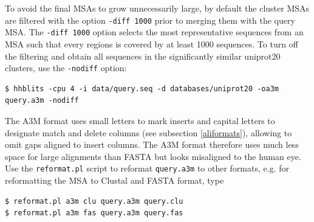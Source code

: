 \documentclass[11pt,a4paper]{article}
\begin{document}
To avoid the final MSAs to grow unnecessarily large, by default the cluster MSAs are filtered with the option \verb`-diff 1000` prior to merging them with the query MSA. The \verb`-diff 1000` option selects the most representative sequences from an MSA such that every regions is covered by at least 1000 sequences. To turn off the filtering and obtain all sequences in the significantly similar uniprot20 clusters, use the \verb`-nodiff` option: 
\begin{verbatim}
$ hhblits -cpu 4 -i data/query.seq -d databases/uniprot20 -oa3m query.a3m -nodiff
\end{verbatim}

The A3M format uses small letters to mark inserts and capital letters to designate match and delete columns (see subsection \ref{aliformats}), allowing to omit gaps aligned to insert columns. The A3M format therefore uses much less space for large alignments than FASTA but looks misaligned to the human eye. Use the \verb`reformat.pl` script to reformat \verb`query.a3m` to other formats, e.g. for reformatting the MSA to Clustal and FASTA format, type

\begin{verbatim}
$ reformat.pl a3m clu query.a3m query.clu
$ reformat.pl a3m fas query.a3m query.fas
\end{verbatim}
\end{document}
